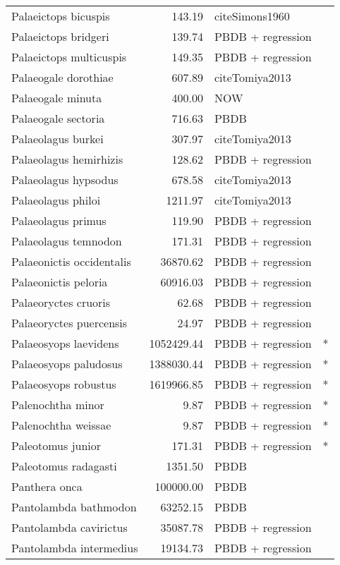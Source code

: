 \begin{table}[ht]
\begin{tabular}{lrll}
  Palaeictops bicuspis & 143.19 & cite{Simons1960} &  \\ 
  Palaeictops bridgeri & 139.74 & PBDB + regression &  \\ 
  Palaeictops multicuspis & 149.35 & PBDB + regression &  \\ 
  Palaeogale dorothiae & 607.89 & cite{Tomiya2013} &  \\ 
  Palaeogale minuta & 400.00 & NOW &  \\ 
  Palaeogale sectoria & 716.63 & PBDB &  \\ 
  Palaeolagus burkei & 307.97 & cite{Tomiya2013} &  \\ 
  Palaeolagus hemirhizis & 128.62 & PBDB + regression &  \\ 
  Palaeolagus hypsodus & 678.58 & cite{Tomiya2013} &  \\ 
  Palaeolagus philoi & 1211.97 & cite{Tomiya2013} &  \\ 
  Palaeolagus primus & 119.90 & PBDB + regression &  \\ 
  Palaeolagus temnodon & 171.31 & PBDB + regression &  \\ 
  Palaeonictis occidentalis & 36870.62 & PBDB + regression &  \\ 
  Palaeonictis peloria & 60916.03 & PBDB + regression &  \\ 
  Palaeoryctes cruoris & 62.68 & PBDB + regression &  \\ 
  Palaeoryctes puercensis & 24.97 & PBDB + regression &  \\ 
  Palaeosyops laevidens & 1052429.44 & PBDB + regression & * \\ 
  Palaeosyops paludosus & 1388030.44 & PBDB + regression & * \\ 
  Palaeosyops robustus & 1619966.85 & PBDB + regression & * \\ 
  Palenochtha minor & 9.87 & PBDB + regression & * \\ 
  Palenochtha weissae & 9.87 & PBDB + regression & * \\ 
  Paleotomus junior & 171.31 & PBDB + regression & * \\ 
  Paleotomus radagasti & 1351.50 & PBDB &  \\ 
  Panthera onca & 100000.00 & PBDB &  \\ 
  Pantolambda bathmodon & 63252.15 & PBDB &  \\ 
  Pantolambda cavirictus & 35087.78 & PBDB + regression &  \\ 
  Pantolambda intermedius & 19134.73 & PBDB + regression &  \\ 

\end{tabular}
\end{table}
